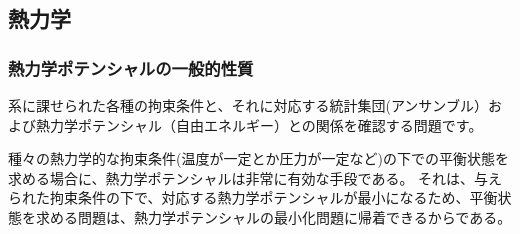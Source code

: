 \documentclass[uplatex,dvipdfmx,a4paper,11pt]{jsarticle}
\begin{document}
\newpage


%
%

\color{black}

\subsection{熱力学}


\subsubsection{熱力学ポテンシャルの一般的性質}

\begin{boxnote}
系に課せられた各種の拘束条件と、それに対応する統計集団(アンサンブル）および熱力学ポテンシャル（自由エネルギー）との関係を確認する問題です。

種々の熱力学的な拘束条件(温度が一定とか圧力が一定など)の下での平衡状態を求める場合に、熱力学ポテンシャルは非常に有効な手段である。
それは、与えられた拘束条件の下で、対応する熱力学ポテンシャルが最小になるため、平衡状態を求める問題は、熱力学ポテンシャルの最小化問題に帰着できるからである。


\end{boxnote}

\vspace{10pt}
\end{document}
